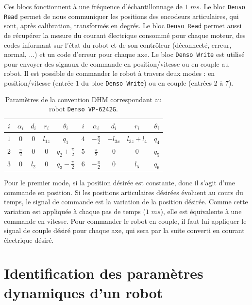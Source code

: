 \documentclass[12pt,a4paper,twoside]{report}
\begin{document}
Ces blocs fonctionnent à une fréquence d'échantillonnage de $1$ $ms$. Le bloc \verb"Denso Read" permet de nous communiquer les positions des encodeurs articulaires, qui sont, après calibration, transformés en degrés. Le bloc \verb"Denso Read" permet aussi de récupérer la mesure du courant électrique consommé pour chaque moteur, des codes informant sur l'état du robot et de son contrôleur (déconnecté, erreur, normal, ...) et un code d'erreur pour chaque axe. Le bloc \verb"Denso Write" est utilisé pour envoyer des signaux de commande en position/vitesse ou en couple au robot.
Il est possible de commander le robot à travers deux modes : en position/vitesse (entrée 1 du bloc \verb"Denso Write") ou en couple (entrées 2 à 7).

\begin{table}[H]
\caption{Paramètres de la convention DHM correspondant au robot \texttt{Denso VP-6242G}.}
\centering
\begin{tabular}{c||c|c|c|c||c||c|c|c|c}
\toprule
\midrule
$i$ & $\alpha_i$ & $d_i$ & $r_i$ & $\theta_i$ & $i$ & $\alpha_i$ & $d_i$ & $r_i$ & $\theta_i$ \\
\midrule
\midrule
$1$ & $0$ & $0$ & $l_{1z}$ & $q_1$ & $4$ & $- \displaystyle \frac{\pi}{2}$ & $- l_{3x}$ & $l_{3z} + l_4$ & $q_4$ \\
\midrule
$2$ & $\displaystyle \frac{\pi}{2}$ & $0$ & $0$ & $q_2 + \displaystyle \frac{\pi}{2}$ & $5$ & $\displaystyle \frac{\pi}{2}$ & $0$ & $0$ & $q_5$ \\
\midrule
$3$ & $0$ & $l_2$ & $0$ & $q_3 - \displaystyle \frac{\pi}{2}$ & $6$ & $- \displaystyle \frac{\pi}{2}$ & $0$ & $l_5$ & $q_6$ \\
\midrule
\bottomrule
\end{tabular}
\label{tab:MDH}
\end{table}

Pour le premier mode, si la position désirée est constante, donc il s'agit d'une commande en position. Si les positions articulaires désirées évoluent au cours du temps, le signal de commande est la variation de la position désirée. Comme cette variation est appliquée à chaque pas de temps ($1$ $ms$), elle est équivalente à une commande en vitesse. Pour commander le robot en couple, il faut lui appliquer le signal de couple désiré pour chaque axe, qui sera par la suite converti en courant électrique désiré.


\chapter{Identification des paramètres dynamiques d'un robot} \label{Chapitre_2}
\minitoc
\end{document}
